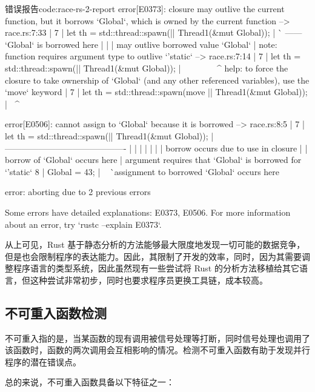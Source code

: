 \documentclass[a4paper, 12pt]{article} %
\newcounter{code}
\numberwithin{equation}{section}
\begin{document}
\begin{code}[{}]{错误报告}{code:race-rs-2-report}
  error[E0373]: closure may outlive the current function, but it borrows `Global`, which is owned by the current function
  --> race.rs:7:33
   |
 7 |   let th = std::thread::spawn(|| Thread1(&mut Global));
   |                 ^^        ------ `Global` is borrowed here
   |                 |
   |                 may outlive borrowed value `Global`
   |
 note: function requires argument type to outlive `'static`
  --> race.rs:7:14
   |
 7 |   let th = std::thread::spawn(|| Thread1(&mut Global));
   |        ^^^^^^^^^^^^^^^^^^^^^^^^^^^^^^^^^^^^^^^^^^^
 help: to force the closure to take ownership of `Global` (and any other referenced variables), use the `move` keyword
   |
 7 |   let th = std::thread::spawn(move || Thread1(&mut Global));
   |                 ^^^^^^^
 
 error[E0506]: cannot assign to `Global` because it is borrowed
  --> race.rs:8:5
   |
 7 |   let th = std::thread::spawn(|| Thread1(&mut Global));
   |        -------------------------------------------
   |        |          |         |
   |        |          |         borrow occurs due to use in closure
   |        |          borrow of `Global` occurs here
   |        argument requires that `Global` is borrowed for `'static`
 8 |   Global = 43;
   |   ^^^^^^^^^^^ assignment to borrowed `Global` occurs here
 
 error: aborting due to 2 previous errors
 
 Some errors have detailed explanations: E0373, E0506.
 For more information about an error, try `rustc --explain E0373`. 
\end{code}

从上可见，Rust 基于静态分析的方法能够最大限度地发现一切可能的数据竞争，但是也会限制程序的表达能力。因此，其限制了开发的效率，同时，因为其需要调整程序语言的类型系统，因此虽然现有一些尝试将 Rust 的分析方法移植给其它语言，但这种尝试非常初步，同时也要求程序员更换工具链，成本较高。

\subsection{不可重入函数检测}

不可重入指的是，当某函数的现有调用被信号处理等打断，同时信号处理也调用了该函数时，函数的两次调用会互相影响的情况。检测不可重入函数有助于发现并行程序的潜在错误点。

总的来说，不可重入函数具备以下特征之一：
\end{document}
